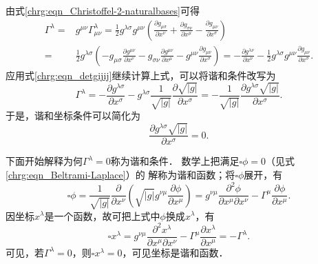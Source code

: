 由式\eqref{chrg:eqn_Christoffel-2-naturalbases}可得
\begin{equation*}
    \begin{aligned}
        \Gamma^\lambda =&  g^{\mu\nu} \Gamma^\lambda_{\mu\nu}
        = \frac{1}{2}{g^{\lambda \sigma}} g^{\mu\nu} \left(
        {\frac{{\partial {g_{\mu \sigma}}}}{{\partial {x^\nu}}}
            + \frac{{\partial {g_{\sigma \nu}}}}{{\partial {x^\mu}}}
            - \frac{{\partial {g_{\mu \nu }}}} {{\partial {x^\sigma }}}} \right) \\
        =&  \frac{1}{2} g^{\lambda \sigma} \left(
        - g_{\mu \sigma} \frac{\partial g^{\mu\nu} } {\partial x^\nu}
        - g_{\sigma \nu} \frac{\partial g^{\mu\nu} } {\partial x^\mu}
        - g^{\mu\nu}\frac{\partial g_{\mu \nu } }   {\partial x^\sigma } \right)
        = - \frac{\partial g^{\lambda\nu} } {\partial x^\nu}
        - \frac{1}{2}  g^{\lambda \sigma}g^{\mu\nu}\frac{\partial g_{\mu \nu } }
        {\partial x^\sigma }   .
    \end{aligned}
\end{equation*}
应用式\eqref{chrg:eqn_detgijij}继续计算上式，可以将谐和条件改写为
\begin{equation}
    \Gamma^\lambda= - \frac{\partial g^{\lambda\sigma} } {\partial x^\sigma}
    - g^{\lambda \sigma} \frac{1}{\sqrt{|g|}}\frac{\partial \sqrt{|g|}}{\partial x^\sigma}
    = - \frac{1}{\sqrt{|g|}} \frac{\partial g^{\lambda\sigma} \sqrt{|g|}}{\partial x^\sigma} .
\end{equation}
于是，谐和坐标条件可以简化为
\begin{equation}
    \frac{\partial g^{\lambda\sigma} \sqrt{|g|}}{\partial x^\sigma} = 0.
\end{equation}







下面开始解释为何$\Gamma^\lambda=0$称为谐和条件．
数学上把满足$\square \phi =0$（见式\eqref{chrg:eqn_Beltrami-Laplace}）的
解称为谐和函数；将$\square \phi$展开，有
\begin{equation}
    \square \phi  = \frac{1}{\sqrt{|g|}}\frac{ \partial }{\partial x^\nu}
    \left( \sqrt{|g|}g^{\nu\mu} \frac{ \partial \phi}{\partial x^\mu}  \right)
    =g^{\nu\mu} \frac{ \partial^2 \phi}{\partial x^\mu \partial x^\nu}
    - \Gamma^\mu \frac{ \partial \phi}{\partial x^\mu} .
\end{equation}
因坐标$x^\lambda$是一个函数，故可把上式中$\phi$换成$x^\lambda$，有
\begin{equation}
    \square x^\lambda  =g^{\nu\mu} \frac{ \partial^2 x^\lambda}{\partial x^\mu \partial x^\nu}
    - \Gamma^\mu \frac{ \partial x^\lambda}{\partial x^\mu}
    =- \Gamma^\lambda .
\end{equation}
可见，若$\Gamma^\lambda=0$，则$\square x^\lambda =0$，可见坐标是谐和函数．





